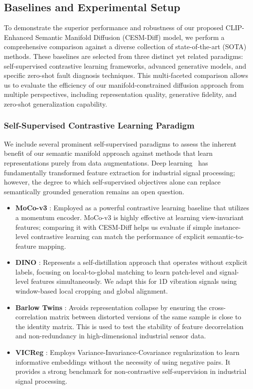 \subsection{Baselines and Experimental Setup}
\label{sec:baselines}

To demonstrate the superior performance and robustness of our proposed CLIP-Enhanced Semantic Manifold Diffusion (CESM-Diff) model, we perform a comprehensive comparison against a diverse collection of state-of-the-art (SOTA) methods. These baselines are selected from three distinct yet related paradigms: self-supervised contrastive learning frameworks, advanced generative models, and specific zero-shot fault diagnosis techniques. This multi-faceted comparison allows us to evaluate the efficiency of our manifold-constrained diffusion approach from multiple perspectives, including representation quality, generative fidelity, and zero-shot generalization capability.

\subsubsection{Self-Supervised Contrastive Learning Paradigm}
We include several prominent self-supervised paradigms to assess the inherent benefit of our semantic manifold approach against methods that learn representations purely from data augmentations. Deep learning~\cite{lecun2015deep} has fundamentally transformed feature extraction for industrial signal processing; however, the degree to which self-supervised objectives alone can replace semantically grounded generation remains an open question.
\begin{itemize}
    \item \textbf{MoCo-v3} \cite{chen2021mocov3}: Employed as a powerful contrastive learning baseline that utilizes a momentum encoder. MoCo-v3 is highly effective at learning view-invariant features; comparing it with CESM-Diff helps us evaluate if simple instance-level contrastive learning can match the performance of explicit semantic-to-feature mapping.
    \item \textbf{DINO} \cite{caron2021dino}: Represents a self-distillation approach that operates without explicit labels, focusing on local-to-global matching to learn patch-level and signal-level features simultaneously. We adapt this for 1D vibration signals using window-based local cropping and global alignment.
    \item \textbf{Barlow Twins} \cite{zbontar2021barlow}: Avoids representation collapse by ensuring the cross-correlation matrix between distorted versions of the same sample is close to the identity matrix. This is used to test the stability of feature decorrelation and non-redundancy in high-dimensional industrial sensor data.
    \item \textbf{VICReg} \cite{bardes2021vicreg}: Employs Variance-Invariance-Covariance regularization to learn informative embeddings without the necessity of using negative pairs. It provides a strong benchmark for non-contrastive self-supervision in industrial signal processing.
\end{itemize}

